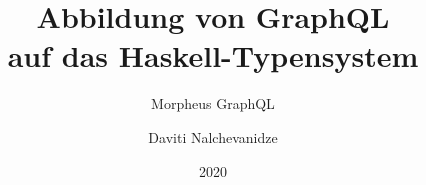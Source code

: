 \documentclass[aspectratio=169,t,xcolor=table]{beamer}
\begin{document}
\title[Inf UFG]{Abbildung von GraphQL \\ auf das Haskell-Typensystem}
\subtitle{Morpheus GraphQL}

\author{Daviti Nalchevanidze}

\date{2020}
\frame[noframenumbering]{\titlepage}





\titlepage


\end{document}
